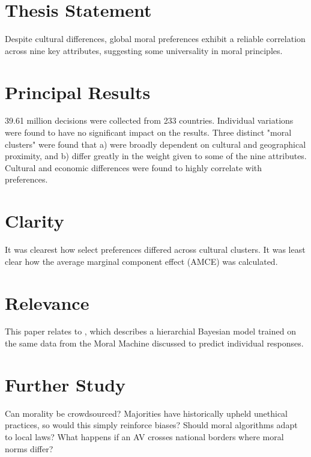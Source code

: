 \documentclass[12pt, letterpaper]{article}
\begin{document}
\section{Thesis Statement}
\label{sec:thesis}
Despite cultural differences, global moral preferences exhibit a reliable correlation across nine key attributes, suggesting some universality in moral principles.

\section{Principal Results}
\label{sec:principal}
39.61 million decisions were collected from 233 countries. Individual variations were found to have no significant impact on the results. Three distinct "moral clusters" were found that a) were broadly dependent on cultural and geographical proximity, and b) differ greatly in the weight given to some of the nine attributes. Cultural and economic differences were found to highly correlate with preferences.


\section{Clarity}
\label{sec:clarity}
It was clearest how select preferences differed across cultural clusters. It was least clear how the average marginal component effect (AMCE) was calculated.

\section{Relevance}
\label{sec:relevance}
This paper relates to \cite{10.1145/3278721.3278770}, which describes a hierarchial Bayesian model trained on the same data from the Moral Machine discussed to predict individual responses. 

\section{Further Study}
\label{sec:further}
Can morality be crowdsourced? Majorities have historically upheld unethical practices, so would this simply reinforce biases? Should moral algorithms adapt to local laws? What happens if an AV crosses national borders where moral norms differ?
\end{document}
